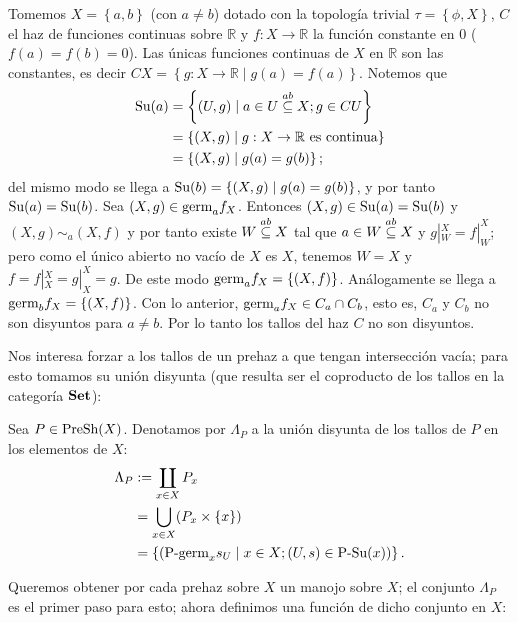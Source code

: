 \begin{Ejm}
   Tomemos $X=\left\lbrace a,b\right\rbrace$ (con $a\neq b$) dotado con la topología trivial $\tau=\left\lbrace \phi,X\right\rbrace$, $C$ el haz de funciones continuas sobre $\mathbb{R}$ y $f:X\to \mathbb{R}$ la función constante en $0$ ($f(a)=f(b)=0$). Las únicas funciones continuas de $X$ en $\mathbb{R}$ son las constantes, es decir $CX=\left\lbrace g:X\to\mathbb{R}\mid g(a)=f(a)\right\rbrace$. Notemos que
   $$
   \begin{aligned}
      \normalfont{\text{Su}}(a)&=\left\lbrace (U,g)\mid a\in U\stackrel{ab}{\subseteq} X;g\in CU\right\rbrace\\
            &=\left\lbrace (X,g)\mid g:X\to\mathbb{R} \text{ es continua}\right\rbrace\\
            &=\left\lbrace (X,g)\mid g(a)=g(b)\right\rbrace;\\
   \end{aligned}
   $$
   del mismo modo se llega a $\normalfont{\text{Su}}(b)=\left\lbrace (X,g)\mid g(a)=g(b)\right\rbrace$, y por tanto $\normalfont{\text{Su}}(a)=\normalfont{\text{Su}}(b)$. Sea $(X,g)\in\normalfont{\text{germ}}_{a}f_{X}$. Entonces $(X,g)\in\normalfont{\text{Su}}(a)=\normalfont{\text{Su}}(b)$ y $(X,g)\sim_{a}(X,f)$ y por tanto existe $W\stackrel{ab}{\subseteq} X$ tal que $a\in W\stackrel{ab}{\subseteq} X$ y $g|^{X}_{W}=f|^{X}_{W}$; pero como el único abierto no vacío de $X$ es $X$, tenemos $W=X$ y $f=f|^{X}_{X}=g|^{X}_{X}=g$. De este modo $\normalfont{\text{germ}}_{a}f_{X}=\left\lbrace (X,f)\right\rbrace$. Análogamente se llega a $\normalfont{\text{germ}}_{b}f_{X}=\left\lbrace (X,f)\right\rbrace$. Con lo anterior, $\normalfont{\text{germ}}_{a}f_{X}\in C_{a}\cap C_{b}$, esto es, $C_a$ y $C_b$ no son disyuntos para $a\neq b$. Por lo tanto los tallos del haz $C$ no son disyuntos.
\end{Ejm}
Nos interesa forzar a los tallos de un prehaz a que tengan intersección vacía; para esto tomamos su unión disyunta (que resulta ser el coproducto de los tallos en la categoría $\normalfont{\textbf{Set}}$):
\begin{Def}
   Sea $P\in\normalfont{\text{PreSh}}(X)$. Denotamos por $\Lambda_P$ a la unión disyunta de los tallos de $P$ en los elementos de $X$:
   $$
   \begin{aligned}
      \Lambda_P&:=\coprod_{x\in X}P_{x}\\
               &=\bigcup_{x\in X}(P_{x}\times\left\lbrace x\right\rbrace)\\
               &=\left\lbrace (\normalfont{\text{P-germ}}_{x}s_{U}\mid x\in X;(U,s)\in\normalfont{\text{P-Su}}(x))\right\rbrace.
   \end{aligned}
   $$
\end{Def}
Queremos obtener por cada prehaz sobre $X$ un manojo sobre $X$; el conjunto $\Lambda_P$ es el primer paso para esto; ahora definimos una función de dicho conjunto en $X$:
